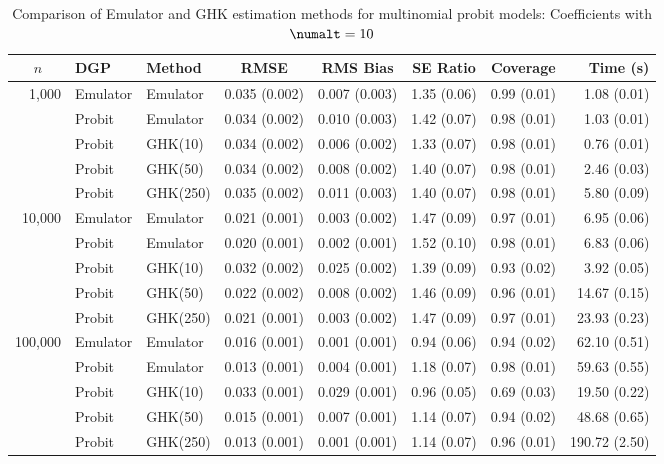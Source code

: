 \begin{table}[htbp]
\centering
\footnotesize
\begin{tabular}{@{}rllrrrrr@{}}
\toprule
\multicolumn{1}{c}{$n$} & \multicolumn{1}{l}{DGP} & \multicolumn{1}{l}{Method} & \multicolumn{1}{c}{RMSE} & \multicolumn{1}{c}{RMS Bias} & \multicolumn{1}{c}{SE Ratio} & \multicolumn{1}{c}{Coverage} & \multicolumn{1}{r}{Time (s)} \\
\midrule
\multirow{5}{*}{1,000} & Emulator & Emulator & 0.035 (0.002) & 0.007 (0.003) & 1.35 (0.06) & 0.99 (0.01) & 1.08 (0.01) \\
 & Probit & Emulator & 0.034 (0.002) & 0.010 (0.003) & 1.42 (0.07) & 0.98 (0.01) & 1.03 (0.01) \\
 & Probit & GHK(10) & 0.034 (0.002) & 0.006 (0.002) & 1.33 (0.07) & 0.98 (0.01) & 0.76 (0.01) \\
 & Probit & GHK(50) & 0.034 (0.002) & 0.008 (0.002) & 1.40 (0.07) & 0.98 (0.01) & 2.46 (0.03) \\
 & Probit & GHK(250) & 0.035 (0.002) & 0.011 (0.003) & 1.40 (0.07) & 0.98 (0.01) & 5.80 (0.09) \\
\midrule
\multirow{5}{*}{10,000} & Emulator & Emulator & 0.021 (0.001) & 0.003 (0.002) & 1.47 (0.09) & 0.97 (0.01) & 6.95 (0.06) \\
 & Probit & Emulator & 0.020 (0.001) & 0.002 (0.001) & 1.52 (0.10) & 0.98 (0.01) & 6.83 (0.06) \\
 & Probit & GHK(10) & 0.032 (0.002) & 0.025 (0.002) & 1.39 (0.09) & 0.93 (0.02) & 3.92 (0.05) \\
 & Probit & GHK(50) & 0.022 (0.002) & 0.008 (0.002) & 1.46 (0.09) & 0.96 (0.01) & 14.67 (0.15) \\
 & Probit & GHK(250) & 0.021 (0.001) & 0.003 (0.002) & 1.47 (0.09) & 0.97 (0.01) & 23.93 (0.23) \\
\midrule
\multirow{5}{*}{100,000} & Emulator & Emulator & 0.016 (0.001) & 0.001 (0.001) & 0.94 (0.06) & 0.94 (0.02) & 62.10 (0.51) \\
 & Probit & Emulator & 0.013 (0.001) & 0.004 (0.001) & 1.18 (0.07) & 0.98 (0.01) & 59.63 (0.55) \\
 & Probit & GHK(10) & 0.033 (0.001) & 0.029 (0.001) & 0.96 (0.05) & 0.69 (0.03) & 19.50 (0.22) \\
 & Probit & GHK(50) & 0.015 (0.001) & 0.007 (0.001) & 1.14 (0.07) & 0.94 (0.02) & 48.68 (0.65) \\
 & Probit & GHK(250) & 0.013 (0.001) & 0.001 (0.001) & 1.14 (0.07) & 0.96 (0.01) & 190.72 (2.50) \\
\bottomrule
\end{tabular}
\caption{Comparison of Emulator and GHK estimation methods for multinomial probit models: Coefficients with $\numalt=10$}
\label{tab:emulator_vs_ghk:10:beta}
\end{table}